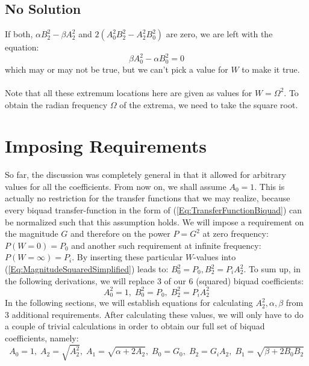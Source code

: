 \subsection{No Solution}
If both, $\alpha B_2^2-\beta A_2^2$ and $2(A_0^2 B_2^2-A_2^2 B_0^2)$ are zero, we are left with the equation:
\begin{equation}
 \beta A_0^2 - \alpha B_0^2 = 0  
\end{equation}
which may or may not be true, but we can't pick a value for $W$ to make it true.

\paragraph{}
Note that all these extremum locations here are given as values for $W = \Omega^2$. To obtain the radian frequency $\Omega$ of the extrema, we need to take the square root.


\section{Imposing Requirements}
So far, the discussion was completely general in that it allowed for arbitrary values for all the coefficients. From now on, we shall assume $A_0 = 1$. This is actually no restriction for the transfer functions that we may realize, because every biquad transfer-function in the form of (\ref{Eq:TransferFunctionBiquad}) can be normalized such that this assumption holds. We will impose a requirement on the magnitude $G$ and therefore on the power $P = G^2$ at zero frequency: $P(W=0) = P_0$ and another such requirement at infinite frequency: $P(W=\infty) = P_i$. By inserting these particular $W$-values into (\ref{Eq:MagnitudeSquaredSimplified}) leads to: $B_0^2 = P_0, B_2^2 = P_i A_2^2$. To sum up, in the following derivations, we will replace 3 of our 6 (squared) biquad coefficients: 
\begin{equation}
 A_0^2 = 1, \; B_0^2 = P_0, \; B_2^2 = P_i A_2^2
\end{equation}
In the following sections, we will establish equations for calculating $A_2^2, \alpha, \beta$ from 3 additional requirements. After calculating these values, we will only have to do a couple of trivial calculations in order to obtain our full set of biquad coefficients, namely:
\begin{equation}
\label{Eq:CoeffsFromIntermediates}
\boxed
{
 A_0 = 1, \;
 A_2 = \sqrt{A_2^2}, \;
 A_1 = \sqrt{\alpha + 2 A_2}, \;
 B_0 = G_0, \;
 B_2 = G_i A_2, \;
 B_1 = \sqrt{\beta + 2 B_0 B_2}
}
\end{equation}

